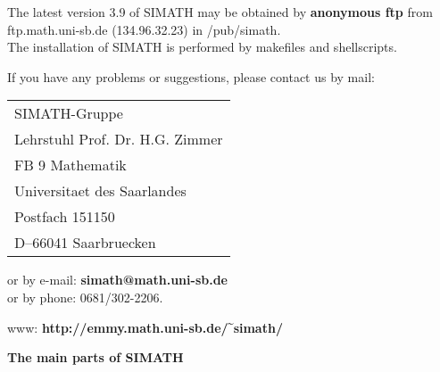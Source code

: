 \vspace{0.4cm} 

\noindent
The latest version 3.9 of SIMATH may be obtained by {\bf anonymous ftp} from
ftp.math.uni-sb.de (134.96.32.23) in /pub/simath.\\
The installation of SIMATH is performed by makefiles and shellscripts.

\vspace{0.4cm}

\noindent
If you have any problems or suggestions, please contact us by mail:
\begin{center}
\begin{tabular}{l}
	SIMATH-Gruppe \\
	Lehrstuhl Prof. Dr. H.G. Zimmer \\
	FB 9 Mathematik \\
	Universitaet des Saarlandes \\
	Postfach 151150 \\
	D--66041 Saarbruecken 
\end{tabular}
\end{center}
or by e-mail: \hspace{2.5cm} {\bf simath@math.uni-sb.de} \\
or by phone: \hspace{2.5cm} 0681/302-2206.\smallskip

\noindent
www: \hspace{3.6cm} {\bf http://emmy.math.uni-sb.de/${\bf \widetilde{~} }$simath/}

\vspace{1cm}

\begin{center}
{\Large {\bf The main parts of SIMATH}}
\end{center}

\vspace{0.4cm}

